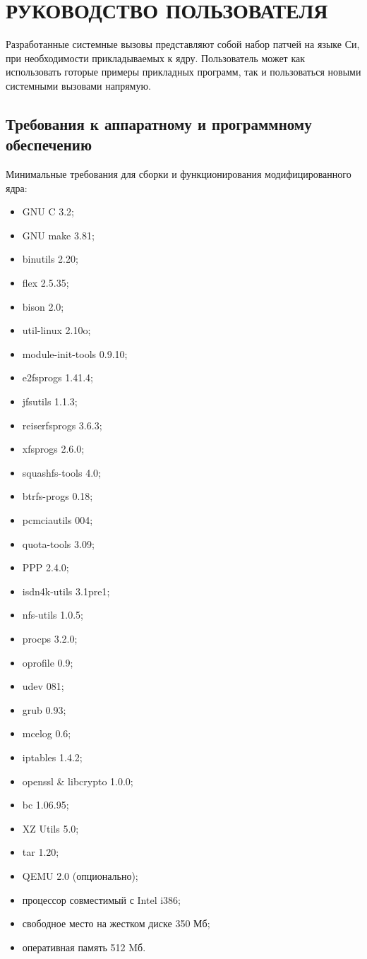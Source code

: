 \section{РУКОВОДСТВО ПОЛЬЗОВАТЕЛЯ}
\label{sec:manual}

Разработанные системные вызовы представляют собой набор патчей на языке Си, при
необходимости прикладываемых к ядру. Пользователь может как использовать готорые
примеры прикладных программ, так и пользоваться новыми системными вызовами
напрямую.

\subsection{Требования к аппаратному и программному обеспечению}

Минимальные требования для сборки и функционирования модифицированного ядра:
\begin{itemize}
\item GNU C 3.2;
\item GNU make 3.81;
\item binutils 2.20;
\item flex 2.5.35;
\item bison 2.0;
\item util-linux 2.10o;
\item module-init-tools 0.9.10;
\item e2fsprogs 1.41.4;
\item jfsutils 1.1.3;
\item reiserfsprogs 3.6.3;
\item xfsprogs 2.6.0;
\item squashfs-tools 4.0;
\item btrfs-progs 0.18;
\item pcmciautils 004;
\item quota-tools 3.09;
\item PPP 2.4.0;
\item isdn4k-utils 3.1pre1;
\item nfs-utils 1.0.5;
\item procps 3.2.0;
\item oprofile 0.9;
\item udev 081;
\item grub 0.93;
\item mcelog 0.6;
\item iptables 1.4.2;
\item openssl \& libcrypto 1.0.0;
\item bc 1.06.95;
\item XZ Utils 5.0;
\item tar 1.20;
\item QEMU 2.0 (опционально);
\item процессор совместимый с Intel i386;
\item свободное место на жестком диске 350 Мб;
\item оперативная память 512 Mб.
\end{itemize}

